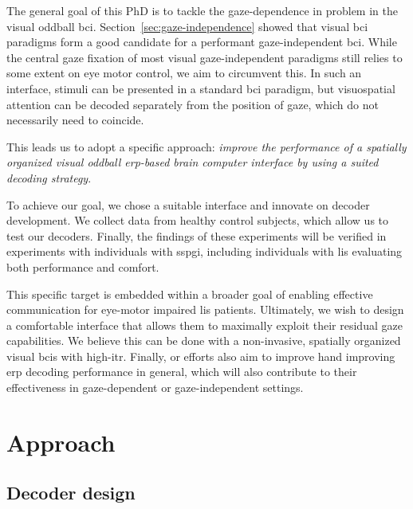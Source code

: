 The general goal of this PhD is to tackle the gaze-dependence in problem in the
visual oddball \ac{bci}.
Section~\ref{sec:gaze-independence} showed that visual \ac{bci} paradigms form
a good candidate for a performant gaze-independent \ac{bci}.
While the central gaze fixation of most visual gaze-independent paradigms still
relies to some extent on eye motor control, we aim to circumvent this.
In such an interface, stimuli can be presented in a standard \ac{bci} paradigm, but
visuospatial attention can be decoded separately from the position of gaze,
which do not necessarily need to coincide.

This leads us to adopt a specific approach: \emph{improve the performance of a
spatially organized visual oddball \ac{erp}-based brain
computer interface by using a suited decoding strategy}.

To achieve our goal, we chose a suitable interface and innovate on decoder
development.
We collect data from healthy control subjects, which allow us to test our decoders.
Finally, the findings of these experiments will be verified in experiments with
individuals with \ac{sspgi}, including individuals with \ac{lis} evaluating
both performance and comfort.

This specific target is embedded within a broader goal of enabling
effective communication for eye-motor impaired \ac{lis} patients.
Ultimately, we wish to design a comfortable interface that allows them to maximally exploit
their residual gaze capabilities.
We believe this can be done with a non-invasive, spatially
organized visual \acp{bci} with high-\ac{itr}.
Finally, or efforts also aim to improve hand improving \ac{erp} decoding performance
in general, which will also contribute to their effectiveness in gaze-dependent
or gaze-independent settings.

\section{Approach}


\subsection{Decoder design}

